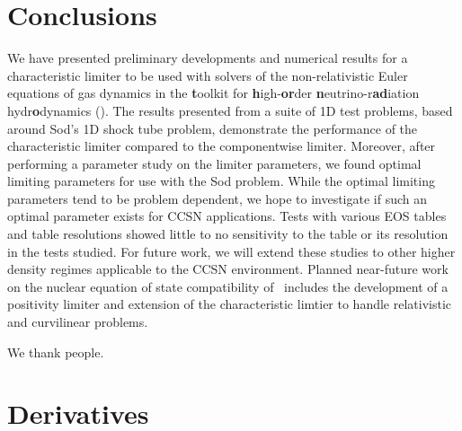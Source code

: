 \documentclass[onecolumn]{aastex62}
\begin{document}
\section{Conclusions}

We have presented preliminary developments and numerical results for a
characteristic limiter to be used with solvers of the non-relativistic
Euler equations of gas dynamics in the {\bf t}oolkit for {\bf h}igh-{\bf or}der
{\bf n}eutrino-r{\bf ad}iation hydr{\bf o}dynamics (\thornado). The results
presented from a suite of 1D test problems, based around Sod's 1D shock
tube problem, demonstrate the performance of the characteristic limiter
compared to the componentwise limiter. Moreover, after performing a parameter
study on the limiter parameters, we found optimal limiting
parameters for use with the Sod problem. While the optimal limiting parameters
tend to be problem dependent, we hope to investigate if such an optimal
parameter exists for CCSN applications. Tests with various EOS tables and
table resolutions showed little to no sensitivity to the table or its
resolution in the tests studied. For future work, we will extend these studies
to other higher density regimes applicable to the CCSN environment.
Planned near-future work on the nuclear equation of state compatibility of
\thornado\, includes the development of a positivity limiter and extension of
the characteristic limtier to handle relativistic and curvilinear problems.

\acknowledgements
We thank people.


\appendix

\section{Derivatives}





\end{document}
